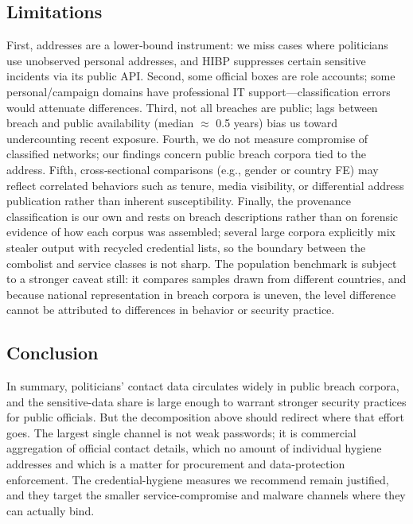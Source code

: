 \documentclass[12pt, letterpaper]{article}
\begin{document}
\subsection{Limitations}
First, addresses are a lower‑bound instrument: we miss cases where politicians use unobserved personal addresses, and HIBP suppresses certain sensitive incidents via its public API. Second, some official boxes are role accounts; some personal/campaign domains have professional IT support—classification errors would attenuate differences. Third, not all breaches are public; lags between breach and public availability (median $\approx$ 0.5 years) bias us toward undercounting recent exposure. Fourth, we do not measure compromise of classified networks; our findings concern public breach corpora tied to the address. Fifth, cross‑sectional comparisons (e.g., gender or country FE) may reflect correlated behaviors such as tenure, media visibility, or differential address publication rather than inherent susceptibility. Finally, the provenance classification is our own and rests on breach descriptions rather than on forensic evidence of how each corpus was assembled; several large corpora explicitly mix stealer output with recycled credential lists, so the boundary between the combolist and service classes is not sharp. The population benchmark is subject to a stronger caveat still: it compares samples drawn from different countries, and because national representation in breach corpora is uneven, the level difference cannot be attributed to differences in behavior or security practice.

\subsection{Conclusion}
In summary, politicians' contact data circulates widely in public breach corpora, and the sensitive-data share is large enough to warrant stronger security practices for public officials. But the decomposition above should redirect where that effort goes. The largest single channel is not weak passwords; it is commercial aggregation of official contact details, which no amount of individual hygiene addresses and which is a matter for procurement and data-protection enforcement. The credential-hygiene measures we recommend remain justified, and they target the smaller service-compromise and malware channels where they can actually bind.


\FloatBarrier
\singlespacing
\small

\end{document}
